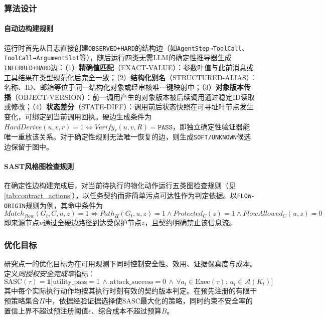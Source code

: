 \subsubsection{算法设计}

\paragraph{自动边构建规则}
运行时首先从日志直接创建\texttt{OBSERVED+HARD}的结构边（如\texttt{AgentStep→ToolCall}、\texttt{ToolCall→ArgumentSlot}等），随后运行四类无需LLM的确定性推导器生成\texttt{INFERRED+HARD}边：（1）\textbf{精确值匹配}（\textsc{EXACT-VALUE}）：参数叶值与此前消息或工具结果在类型规范化后完全一致；（2）\textbf{结构化别名}（\textsc{STRUCTURED-ALIAS}）：名称、ID、邮箱等位于同一结构化对象或经审核唯一键映射中；（3）\textbf{对象版本传播}（\textsc{OBJECT-VERSION}）：前一调用产生的对象版本被后续调用通过稳定ID读取或修改；（4）\textbf{状态差分}（\textsc{STATE-DIFF}）：调用前后状态快照在可寻址叶节点发生变化，可绑定到当前调用回执。硬边生成条件为$HardDerive(u,v,r)=1 \iff Verify_r(u,v,R)=\texttt{PASS}$，即独立确定性验证器能唯一重放该关系。对于确定性规则无法唯一恢复的边，则生成\texttt{SOFT/UNKNOWN}候选边保留于图中。

\paragraph{SAST风格图检查规则}
在确定性边构建完成后，对当前待执行的物化动作运行五类图检查规则（见\autoref{tab:contract_actions}），以任务契约而非简单污点可达性作为判定依据。以\texttt{FLOW-ORIGIN}规则为例，其命中条件为
\begin{equation}
  Match_{flow}(G_t, C, u, z) = 1 \iff
  Path_H(G_t, u, z) = 1 \land Protected_C(z) = 1 \land FlowAllowed_C(u, z) = 0
  \label{eq:flow_origin}
\end{equation}
即来源节点$u$通过全硬边路径到达受保护节点$z$，且契约明确禁止该信息流。



\subsubsection{优化目标}

研究点一的优化目标为在可用观测下同时控制安全性、效用、证据保真度与成本。定义\emph{同授权安全完成率}指标：
\begin{equation}
  \text{SASC}(\tau) = \mathbb{1}\Big[\text{utility\_pass}=1 \,\land\, \text{attack\_success}=0 \,\land\, \forall a_t \in \text{Exec}(\tau):\ a_t \in \mathcal{A}(K_t)\Big]
  \label{eq:sasc}
\end{equation}
其中每个实际执行动作均按其执行时刻有效的契约版本判定。在预先注册的有限干预策略集合$\Pi$中，依据经验证据选择使$\text{SASC}$最大化的策略，同时约束不安全率的置信上界不超过预注册阈值$\epsilon$、综合成本不超过预算$B$。

